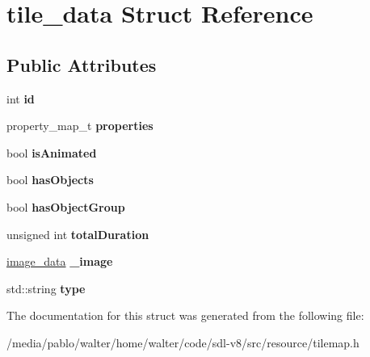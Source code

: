 \hypertarget{structtile__data}{}\section{tile\+\_\+data Struct Reference}
\label{structtile__data}
\subsection*{Public Attributes}
\begin{DoxyCompactItemize}
\item 
\mbox{\label{structtile__data_a86bc18029408cda2138b2f0dafba47fd}} 
int {\bfseries id}
\item 
\mbox{\label{structtile__data_a45efd4f5e255d758b9644f6ac2d8f55a}} 
property\+\_\+map\+\_\+t {\bfseries properties}
\item 
\mbox{\label{structtile__data_a77f9a7d4eba38f4f53f592a738511f9f}} 
bool {\bfseries is\+Animated}
\item 
\mbox{\label{structtile__data_a642784cc6afefb5e389fcf6854e36df0}} 
bool {\bfseries has\+Objects}
\item 
\mbox{\label{structtile__data_aa1af5052aa5be306049f67b5baca3a06}} 
bool {\bfseries has\+Object\+Group}
\item 
\mbox{\label{structtile__data_a8cbe9ebac20a0689e5074245a02bde54}} 
unsigned int {\bfseries total\+Duration}
\item 
\mbox{\label{structtile__data_ae2bfd42eaf4737e1d820129c70ca6321}} 
\mbox{\hyperlink{structimage__data}{image\+\_\+data}} {\bfseries \+\_\+image}
\item 
\mbox{\label{structtile__data_a5a4c97523dc40bdd9d4e29c302e70e51}} 
std\+::string {\bfseries type}
\end{DoxyCompactItemize}


The documentation for this struct was generated from the following file\+:\begin{DoxyCompactItemize}
\item 
/media/pablo/walter/home/walter/code/sdl-\/v8/src/resource/tilemap.\+h\end{DoxyCompactItemize}
